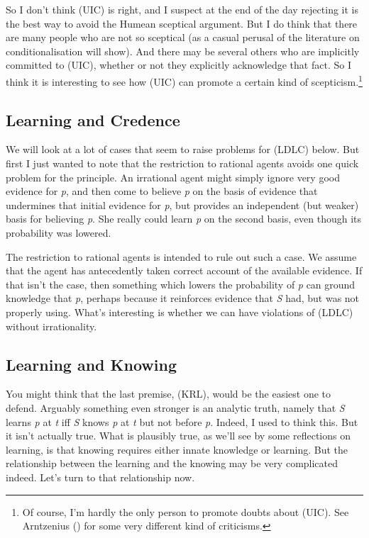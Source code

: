 \documentclass[
  11pt,
  letterpaper,
  DIV=11,
  numbers=noendperiod,
  twoside]{scrartcl}
\begin{document}
So I don't think (UIC) is right, and I suspect at the end of the day
rejecting it is the best way to avoid the Humean sceptical argument. But
I do think that there are many people who are not so sceptical (as a
casual perusal of the literature on conditionalisation will show). And
there may be several others who are implicitly committed to (UIC),
whether or not they explicitly acknowledge that fact. So I think it is
interesting to see how (UIC) can promote a certain kind of
scepticism.\footnote{Of course, I'm hardly the only person to promote
  doubts about (UIC). See Arntzenius
  () for some very different
  kind of criticisms.}

\subsection{Learning and Credence}\label{learning-and-credence}

We will look at a lot of cases that seem to raise problems for (LDLC)
below. But first I just wanted to note that the restriction to rational
agents avoids one quick problem for the principle. An irrational agent
might simply ignore very good evidence for \emph{p}, and then come to
believe \emph{p} on the basis of evidence that undermines that initial
evidence for \emph{p}, but provides an independent (but weaker) basis
for believing \emph{p}. She really could learn \emph{p} on the second
basis, even though its probability was lowered.

The restriction to rational agents is intended to rule out such a case.
We assume that the agent has antecedently taken correct account of the
available evidence. If that isn't the case, then something which lowers
the probability of \emph{p} can ground knowledge that \emph{p}, perhaps
because it reinforces evidence that \emph{S} had, but was not properly
using. What's interesting is whether we can have violations of (LDLC)
without irrationality.

\subsection{Learning and Knowing}\label{learning-and-knowing}

You might think that the last premise, (KRL), would be the easiest one
to defend. Arguably something even stronger is an analytic truth, namely
that \emph{S} learns \emph{p} at \emph{t} iff \emph{S} knows \emph{p} at
\emph{t} but not before \emph{p}. Indeed, I used to think this. But it
isn't actually true. What is plausibly true, as we'll see by some
reflections on learning, is that knowing requires either innate
knowledge or learning. But the relationship between the learning and the
knowing may be very complicated indeed. Let's turn to that relationship
now.
\end{document}
